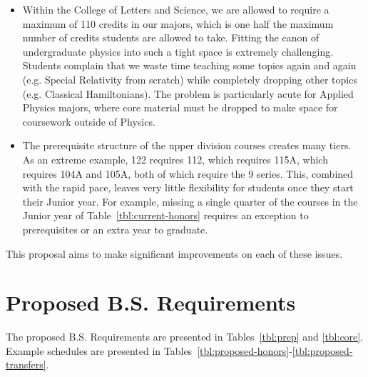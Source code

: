 \documentclass[12pt]{article}
\begin{document}
\begin{itemize}
\item Within the College of Letters and Science, we are allowed to require a maximum of 110 credits in our majors, which is one half the maximum number of credits students are allowed to take.  Fitting the canon of undergraduate physics into such a tight space is extremely challenging.  Students complain that we waste time teaching some topics again and again (e.g. Special Relativity from scratch) while completely dropping other topics (e.g. Classical Hamiltonians).  The problem is particularly acute for Applied Physics majors, where core material must be dropped to make space for coursework outside of Physics.

\item The prerequisite structure of the upper division courses creates many tiers.  
As an extreme example, 122 requires 112, which requires 115A, which requires 104A and 105A, both of which require the 9 series.  This, combined with the rapid pace, leaves very little flexibility for students once they start their Junior year.  For example, missing a single quarter of the courses in the Junior year of Table~\ref{tbl:current-honors} requires an exception to prerequisites or an extra year to graduate.

\label{tbl:current-honors}

\end{itemize}

This proposal aims to make significant improvements on each of these issues.
\newpage

\section{Proposed B.S. Requirements}

The proposed B.S. Requirements are presented in Tables~\ref{tbl:prep} and \ref{tbl:core}.  Example schedules are presented in Tables~\ref{tbl:proposed-honors}-\ref{tbl:proposed-transfers}.
\end{document}
